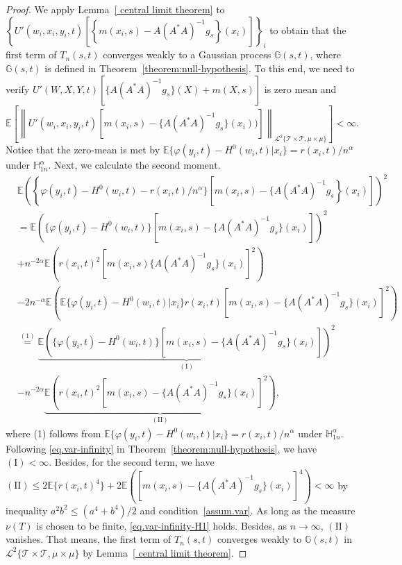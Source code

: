 \documentclass[
  12pt]{article}
\def\to{\rightarrow}
\def\mG{\mathbb{G}}
\def\mH{\mathbb{H}}
\def\cL{\mathcal{L}}
\def\cT{\mathcal{T}}
\begin{document}
\begin{proof}
We apply Lemma~\ref{ central limit theorem} to $\left\{ U'(w_i,x_i,y_i,t)\left[ \left\{m(x_i,s)-A(A^*A)^{-1}g_s\right\}(x_i)\right] \right\}_i$ to obtain that the first term of $T_n(s,t)$ converges weakly to a Gaussian process $\mG(s,t)$, where $\mathbb{G}(s,t)$ is defined in Theorem~\ref{theorem:null-hypothesis}.  To this end, we need to verify $U'(W,X,Y,t)[ \{A(A^*A)^{-1}g_s\}(X)+m(X,s)]$ is zero mean and 
\begin{equation}
\label{eq.var-infinity-H1}
    \mathbb{E} \left[ \left\| U'(w_i,x_i,y_i,t)[m(x_i,s)-\{A(A^*A)^{-1}g_s\}(x_i))] \right\|_{\cL^2\{\cT \times \cT, \mu \times \mu\}} \right] <\infty. 
\end{equation}
Notice that the zero-mean is met by $\mathbb{E} \{\varphi(y_i,t)-H^0(w_i,t)|x_i\}=r(x_i,t)/n^\alpha$ under $\mH_{1n}^\alpha$. Next, we calculate the second moment.
\begin{align*}
	& \mathbb{E} \left(\left\{\varphi(y_i,t)-H^0(w_i,t)-r(x_i,t)/n^\alpha \}\left[m(x_i,s)-\{A(A^*A)^{-1}g_s \right\}(x_i)\right] \right)^2\\
	& = \mathbb{E} (\{\varphi(y_i,t)-H^0(w_i,t)\}[m(x_i,s)-\{A(A^*A)^{-1}g_s\}(x_i)])^2\\
    & +n^{-2\alpha}\mathbb{E} \left( r(x_i,t)^2[m(x_i,s)\{A(A^*A)^{-1}g_s\}(x_i)]^2 \right)\\
	& -2n^{-\alpha}\mathbb{E} \left( \mathbb{E} \{\varphi(y_i,t)-H^0(w_i,t)|x_i\}r(x_i,t)[m(x_i,s)-\{A(A^*A)^{-1}g_s\}(x_i)]^2 \right)\\
	& \overset{(1)}{=} \underset{( \mathrm{I} )}{\underbrace{\mathbb{E} (\{\varphi(y_i,t)-H^0(w_i,t)\}[m(x_i,s)-\{A(A^*A)^{-1}g_s\}(x_i)])^2}}\\
    & -n^{-2\alpha}\underset{( \mathrm{II} )}{\underbrace{\mathbb{E} \left( r(x_i,t)^2[m(x_i,s)-\{A(A^*A)^{-1}g_s\}(x_i)]^2 \right) }},
\end{align*}
where (1) follows from $\mathbb{E} \{\varphi(y_i,t)-H^0(w_i,t)|x_i\}=r(x_i,t)/n^\alpha$ under $\mH_{1n}^\alpha$. Following \eqref{eq.var-infinity} in Theorem~\ref{theorem:null-hypothesis}, we have $(\mathrm{I})<\infty$. Besides, for the second term, we have $( \mathrm{II} ) \leq 2\mathbb{E} \{r(x_i,t)^4\}+2\mathbb{E} \left( [m(x_i,s)-\{A(A^*A)^{-1}g_s\}(x_i)]^4 \right) <\infty$ by inequality $a^2b^2\le(a^4+b^4)/2$ and condition~\ref{assum.var}. As long as the measure $\nu(T)$ is chosen to be finite, \eqref{eq.var-infinity-H1} holds. Besides, as $n \to \infty$, $\mathrm{(II)}$ vanishes. That means, the first term of $T_n(s,t)$ converges weakly to $\mathbb{G}(s,t)$ in $\mathcal{L}^{2}\{\cT \times \cT, \mu \times \mu\}$ by Lemma~\ref{ central limit theorem}. 


\end{proof}
\end{document}
